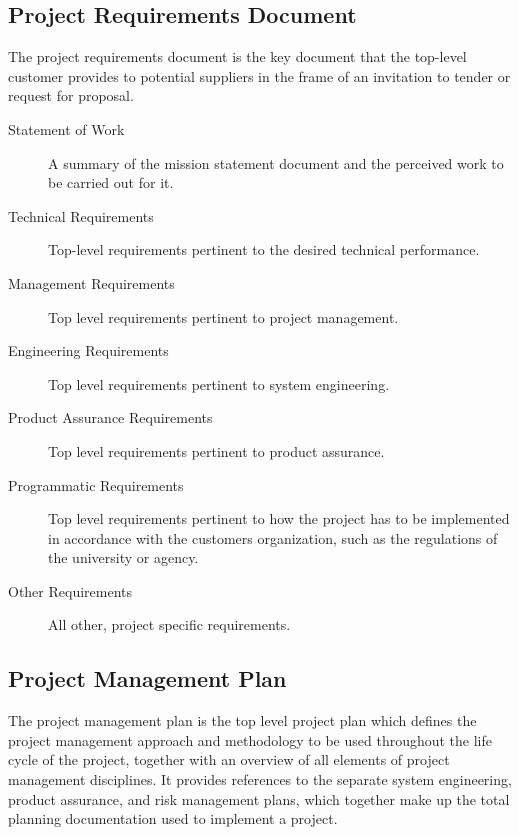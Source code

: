 \subsection{Project Requirements Document}
\label{sec:Project Requirements Document}
The project requirements document is the key document that the top-level customer provides to potential suppliers in the frame of an invitation to tender or request for proposal.

\begin{description}
\item[Statement of Work]
A summary of the mission statement document and the perceived work to be carried out for it.
\item[Technical Requirements]
Top-level requirements pertinent to the desired technical performance.
\item[Management Requirements]
Top level requirements pertinent to project management.
\item[Engineering Requirements]
Top level requirements pertinent to system engineering.
\item[Product Assurance Requirements]
Top level requirements pertinent to product assurance.
\item[Programmatic Requirements]
Top level requirements pertinent to how the project has to be implemented in accordance with the customers organization, such as the regulations of the university or agency.
\item[Other Requirements]
All other, project specific requirements.
\end{description}


\subsection{Project Management Plan}
\label{app:Project Management Plan}
The project management plan is the top level project plan which defines the project management approach and methodology to be used throughout the life cycle of the project, together with an overview of all elements of project management disciplines. It provides references to the separate system engineering, product assurance, and risk management plans, which together make up the total planning documentation used to implement a project.


